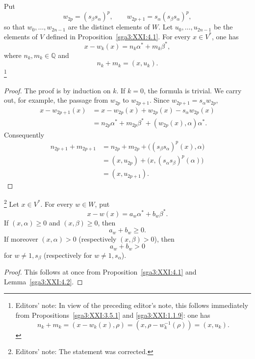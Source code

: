 \begin{lemma}\label{sga3:XXI:4.2}
Put
\[
 w_{2p}=(s_\beta s_\alpha)^p,
 \qquad
 w_{2p+1}=s_\alpha(s_\beta s_\alpha)^p,
\]
so that \(w_0,\ldots,w_{2n-1}\) are the distinct elements of \(W\).
Let \(u_0,\ldots,u_{2n-1}\) be the elements of \(V\) defined in
Proposition~\ref{sga3:XXI:4.1}. For every \(x\in V^\ast\), one has
\[
 x-w_k(x)=n_k\alpha^\ast+m_k\beta^\ast,
\]
where \(n_k,m_k\in\mathbb Q\) and
\[
 n_k+m_k=(x,u_k).
\]
\footnote{Editors' note: In view of the preceding editor's note, this
follows immediately from Propositions~\ref{sga3:XXI:3.5.1} and
\ref{sga3:XXI:1.1.9}: one has
\[
 n_k+m_k=(x-w_k(x),\rho)
 =(x,\rho-w_k^{-1}(\rho))=(x,u_k).
\]}
\end{lemma}

\begin{proof}
The proof is by induction on \(k\). If \(k=0\), the formula is
trivial. We carry out, for example, the passage from \(w_{2p}\) to
\(w_{2p+1}\). Since \(w_{2p+1}=s_\alpha w_{2p}\),
\[
\begin{aligned}
x-w_{2p+1}(x)
 &=x-w_{2p}(x)+w_{2p}(x)-s_\alpha w_{2p}(x)\\
 &=n_{2p}\alpha^\ast+m_{2p}\beta^\ast
   +(w_{2p}(x),\alpha)\alpha^\ast.
\end{aligned}
\]
Consequently
\[
\begin{aligned}
n_{2p+1}+m_{2p+1}
 &=n_{2p}+m_{2p}
   +\bigl((s_\beta s_\alpha)^p(x),\alpha\bigr)\\
 &=(x,u_{2p})+\bigl(x,(s_\alpha s_\beta)^p(\alpha)\bigr)\\
 &=(x,u_{2p+1}).
\end{aligned}
\]
\end{proof}


\begin{corollary}\label{sga3:XXI:4.3}
\footnote{Editors' note: The statement was corrected.}
Let \(x\in V^\ast\). For every \(w\in W\), put
\[
 x-w(x)=a_w\alpha^\ast+b_w\beta^\ast.
\]
If \((x,\alpha)\ge0\) and \((x,\beta)\ge0\), then
\[
 a_w+b_w\ge0.
\]
If moreover \((x,\alpha)>0\) (respectively \((x,\beta)>0\)), then
\[
 a_w+b_w>0
\]
for \(w\ne1,s_\beta\) (respectively for \(w\ne1,s_\alpha\)).
\end{corollary}

\begin{proof}
This follows at once from Proposition~\ref{sga3:XXI:4.1} and
Lemma~\ref{sga3:XXI:4.2}.
\end{proof}

